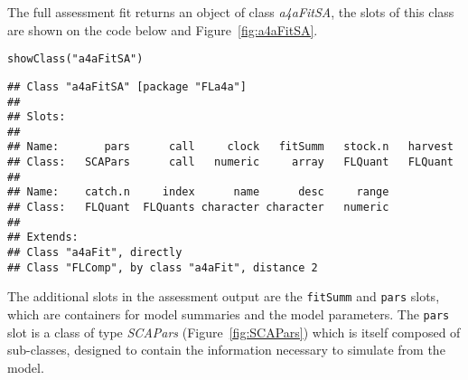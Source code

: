 \documentclass[a4paper,english,10pt]{article}\usepackage[]{graphicx}\usepackage[]{color}
\makeatletter
\newcommand{\hlstr}[1]{\textcolor[rgb]{0.2,0.2,0.2}{#1}}%
\newcommand{\hlstd}[1]{\textcolor[rgb]{0,0,0}{#1}}%
\newcommand{\hlkwd}[1]{\textcolor[rgb]{0.361,0.506,0.596}{#1}}%
\newenvironment{kframe}{%
 \def\at@end@of@kframe{}%
 \ifinner\ifhmode%
  \def\at@end@of@kframe{\end{minipage}}%
  \begin{minipage}{\columnwidth}%
 \fi\fi%
 \def\FrameCommand##1{\hskip\@totalleftmargin \hskip-\fboxsep
 \colorbox{shadecolor}{##1}\hskip-\fboxsep
     \hskip-\linewidth \hskip-\@totalleftmargin \hskip\columnwidth}%
 \MakeFramed {\advance\hsize-\width
   \@totalleftmargin\z@ \linewidth\hsize
   \@setminipage}}%
 {\par\unskip\endMakeFramed%
 \at@end@of@kframe}
\newenvironment{knitrout}{}{} %
\newcommand{\code}[1]{{\texttt{#1}}}
\newcommand{\class}[1]{{\textit{#1}}}
\makeatother
\begin{document}
The full assessment fit returns an object of class \class{a4aFitSA}, the slots of this class are shown on the code below and Figure~\ref{fig:a4aFitSA}.

\begin{knitrout}
\color{fgcolor}\begin{kframe}
\begin{alltt}
\hlkwd{showClass}\hlstd{(}\hlstr{"a4aFitSA"}\hlstd{)}
\end{alltt}
\begin{verbatim}
## Class "a4aFitSA" [package "FLa4a"]
## 
## Slots:
##                                                                   
## Name:       pars      call     clock   fitSumm   stock.n   harvest
## Class:   SCAPars      call   numeric     array   FLQuant   FLQuant
##                                                         
## Name:    catch.n     index      name      desc     range
## Class:   FLQuant  FLQuants character character   numeric
## 
## Extends: 
## Class "a4aFit", directly
## Class "FLComp", by class "a4aFit", distance 2
\end{verbatim}
\end{kframe}
\end{knitrout}

\begin{knitrout}
\color{fgcolor}\begin{kframe}


{\ttfamily\noindent\bfseries{}}\end{kframe}
\end{knitrout}

The additional slots in the assessment output are the \code{fitSumm} and \code{pars} slots, which are containers for model summaries and the model parameters. The \code{pars} slot is a class of type \class{SCAPars} (Figure~\ref{fig:SCAPars}) which is itself composed of sub-classes, designed to contain the information necessary to simulate from the model.
\end{document}
